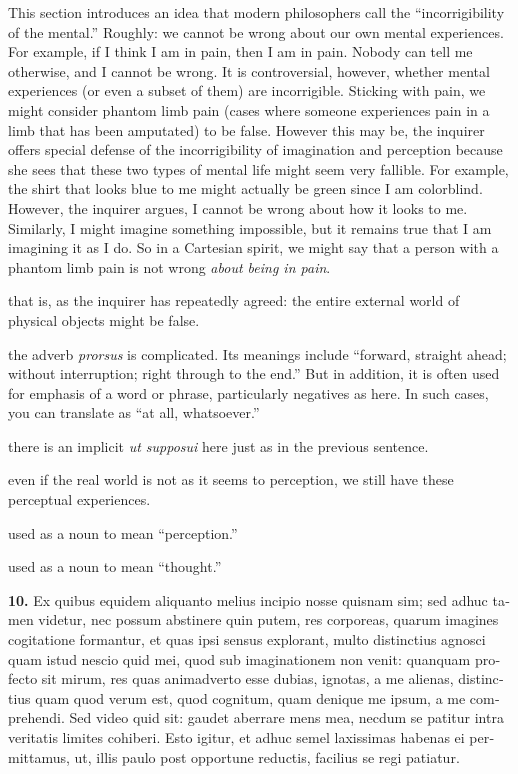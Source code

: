  This section introduces an idea that modern philosophers call the ``incorrigibility of the mental.'' Roughly: we cannot be wrong about our own mental experiences. For example, if I think I am in pain, then I am in pain. Nobody can tell me otherwise, and I cannot be wrong. It is controversial, however, whether mental experiences (or even a subset of them) are incorrigible. Sticking with pain, we might consider phantom limb pain (cases where someone experiences pain in a limb that has been amputated) to be false. However this may be, the inquirer offers special defense of the incorrigibility of imagination and perception because she sees that these two types of mental life might seem very fallible. For example, the shirt that looks blue to me might actually be green since I am colorblind. However, the inquirer argues, I cannot be wrong about how it looks to me. Similarly, I might imagine something impossible, but it remains true that I am imagining it as I do. So in a Cartesian spirit, we might say that a person with a phantom limb pain is not wrong \textit{about being in pain}.

 that is, as the inquirer has repeatedly agreed: the entire external world of physical objects might be false.

 the adverb \textit{prorsus} is complicated. Its meanings include ``forward, straight ahead; without interruption; right through to the end.'' But in addition, it is often used for emphasis of a word or phrase, particularly negatives as here. In such cases, you can translate as ``at all, whatsoever.''

 there is an implicit \textit{ut supposui} here just as in the previous sentence.

 even if the real world is not as it seems to perception, we still have these perceptual experiences.

 used as a noun to mean ``perception.''

 used as a noun to mean ``thought.''

\clearpage

\beginnumbering
\pstart
\begin{latin}
    \textenglish{\textbf{10.}} Ex quibus equidem aliquanto melius incipio nosse quisnam sim; sed adhuc tamen videtur, nec possum abstinere quin putem, res corporeas, quarum imagines cogitatione formantur, et quas ipsi sensus explorant, multo distinctius agnosci quam istud nescio quid mei, quod sub imaginationem non venit: quanquam profecto sit mirum, res quas animadverto esse dubias, ignotas, a me alienas, distinctius quam quod verum est, quod cognitum, quam denique me ipsum, a me comprehendi. Sed video quid sit: gaudet aberrare mens mea, necdum se patitur intra veritatis limites cohiberi. Esto igitur, et adhuc semel laxissimas habenas ei permittamus, ut, illis paulo post opportune reductis, facilius se regi patiatur.
\end{latin}
\pend
\endnumbering

